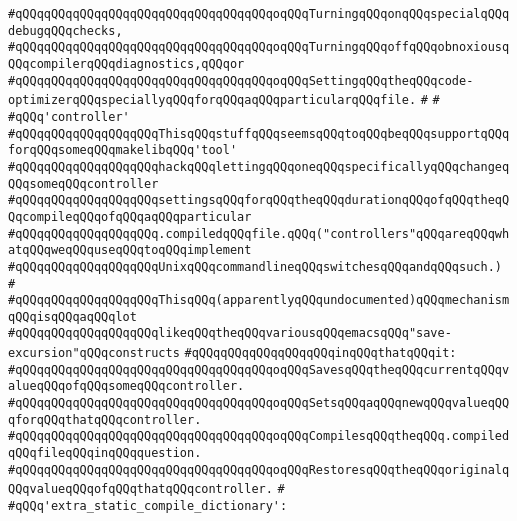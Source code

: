 \verb|#qQQqqQQqqQQqqQQqqQQqqQQqqQQqqQQqqQQqoqQQqTurningqQQqonqQQqspecialqQQqdebugqQQqchecks,|\newline
\verb|#qQQqqQQqqQQqqQQqqQQqqQQqqQQqqQQqqQQqoqQQqTurningqQQqoffqQQqobnoxiousqQQqcompilerqQQqdiagnostics,qQQqor|\newline
\verb|#qQQqqQQqqQQqqQQqqQQqqQQqqQQqqQQqqQQqoqQQqSettingqQQqtheqQQqcode-optimizerqQQqspeciallyqQQqforqQQqaqQQqparticularqQQqfile.|\newline
\verb|#|\newline
\verb|#|\newline
\verb|#qQQq'controller'|\newline
\verb|#qQQqqQQqqQQqqQQqqQQqThisqQQqstuffqQQqseemsqQQqtoqQQqbeqQQqsupportqQQqforqQQqsomeqQQqmakelibqQQq'tool'|\newline
\verb|#qQQqqQQqqQQqqQQqqQQqhackqQQqlettingqQQqoneqQQqspecificallyqQQqchangeqQQqsomeqQQqcontroller|\newline
\verb|#qQQqqQQqqQQqqQQqqQQqsettingsqQQqforqQQqtheqQQqdurationqQQqofqQQqtheqQQqcompileqQQqofqQQqaqQQqparticular|\newline
\verb|#qQQqqQQqqQQqqQQqqQQq.compiledqQQqfile.qQQq("controllers"qQQqareqQQqwhatqQQqweqQQquseqQQqtoqQQqimplement|\newline
\verb|#qQQqqQQqqQQqqQQqqQQqUnixqQQqcommandlineqQQqswitchesqQQqandqQQqsuch.)|\newline
\verb|#|\newline
\verb|#qQQqqQQqqQQqqQQqqQQqThisqQQq(apparentlyqQQqundocumented)qQQqmechanismqQQqisqQQqaqQQqlot|\newline
\verb|#qQQqqQQqqQQqqQQqqQQqlikeqQQqtheqQQqvariousqQQqemacsqQQq"save-excursion"qQQqconstructs|\newline
\verb|#qQQqqQQqqQQqqQQqqQQqinqQQqthatqQQqit:|\newline
\verb|#qQQqqQQqqQQqqQQqqQQqqQQqqQQqqQQqqQQqoqQQqSavesqQQqtheqQQqcurrentqQQqvalueqQQqofqQQqsomeqQQqcontroller.|\newline
\verb|#qQQqqQQqqQQqqQQqqQQqqQQqqQQqqQQqqQQqoqQQqSetsqQQqaqQQqnewqQQqvalueqQQqforqQQqthatqQQqcontroller.|\newline
\verb|#qQQqqQQqqQQqqQQqqQQqqQQqqQQqqQQqqQQqoqQQqCompilesqQQqtheqQQq.compiledqQQqfileqQQqinqQQqquestion.|\newline
\verb|#qQQqqQQqqQQqqQQqqQQqqQQqqQQqqQQqqQQqoqQQqRestoresqQQqtheqQQqoriginalqQQqvalueqQQqofqQQqthatqQQqcontroller.|\newline
\verb|#|\newline
\verb|#qQQq'extra_static_compile_dictionary':|\newline
